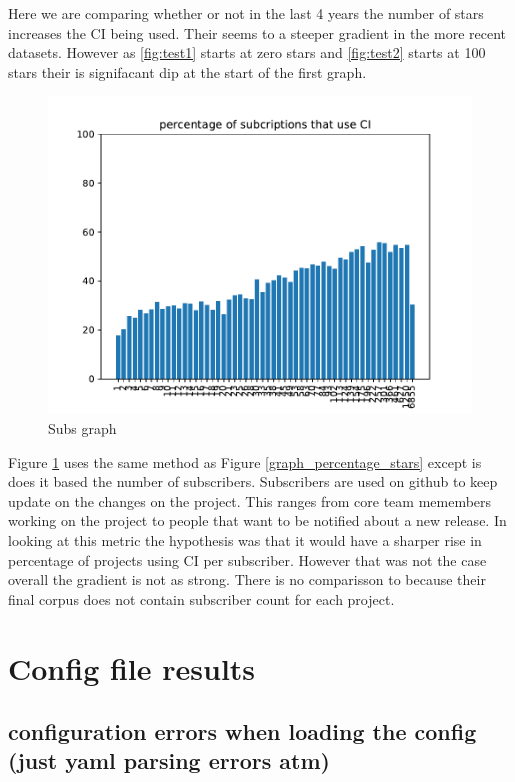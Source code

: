 \documentclass[twoside,12pt,titlepage,a4paper]{article}
\begin{document}
Here we are comparing whether or not in the last 4 years the number of stars increases the CI being used. Their seems to a steeper gradient in the more recent datasets. However as \ref{fig:test1} starts at zero stars and \ref{fig:test2} starts at 100 stars their is signifacant dip at the start of the first graph.

\begin{figure}[!h]
  \centering
  \includegraphics[width=.3\textwidth]{../src/results/percentage sub with CI.pdf}
  \caption{Subs graph}
  \label{graph_percentage_subs}
\end{figure}

Figure \ref{graph_percentage_subs} uses the same method as Figure \ref{graph_percentage_stars} except is does it based the number of subscribers. Subscribers are used on github to keep update on the changes on the project. This ranges from core team memembers working on the project to people that want to be notified about a new release. 
In looking at this metric the hypothesis was that it would have a sharper rise in percentage of projects using CI per subscriber. However that was not the case overall the gradient is not as strong. There is no comparisson to \cite{Hilton2016} because their final corpus does not contain subscriber count for each project.






\section{Config file results}

\vspace*{-0.05in}
\subsection{configuration errors when loading the config (just yaml parsing errors atm)}
\vspace*{-0.05in}




\vspace*{-0.05in}
\end{document}
